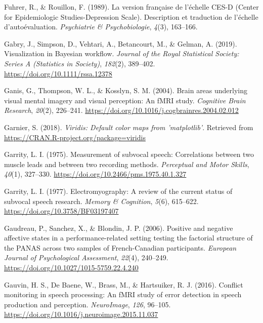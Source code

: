 \documentclass[a4paper,12pt,twoside,onecolumn,openright,final,oldfontcommands]{memoir}
\begin{document}
\leavevmode\hypertarget{ref-fuhrer_version_1989}{}%
Fuhrer, R., \& Rouillon, F. (1989). La version française de l'échelle CES-D (Center for Epidemiologic Studies-Depression Scale). Description et traduction de l'échelle d'autoévaluation. \emph{Psychiatrie \& Psychobiologie}, \emph{4}(3), 163--166.

\leavevmode\hypertarget{ref-gabry_visualization_2019}{}%
Gabry, J., Simpson, D., Vehtari, A., Betancourt, M., \& Gelman, A. (2019). Visualization in Bayesian workﬂow. \emph{Journal of the Royal Statistical Society: Series A (Statistics in Society)}, \emph{182}(2), 389--402. \url{https://doi.org/10.1111/rssa.12378}

\leavevmode\hypertarget{ref-ganis_brain_2004}{}%
Ganis, G., Thompson, W. L., \& Kosslyn, S. M. (2004). Brain areas underlying visual mental imagery and visual perception: An fMRI study. \emph{Cognitive Brain Research}, \emph{20}(2), 226--241. \url{https://doi.org/10.1016/j.cogbrainres.2004.02.012}

\leavevmode\hypertarget{ref-R-viridis}{}%
Garnier, S. (2018). \emph{Viridis: Default color maps from 'matplotlib'}. Retrieved from \url{https://CRAN.R-project.org/package=viridis}

\leavevmode\hypertarget{ref-garrity_measurement_1975}{}%
Garrity, L. I. (1975). Measurement of subvocal speech: Correlations between two muscle leads and between two recording methods. \emph{Perceptual and Motor Skills}, \emph{40}(1), 327--330. \url{https://doi.org/10.2466/pms.1975.40.1.327}

\leavevmode\hypertarget{ref-garrity_electromyography_1977}{}%
Garrity, L. I. (1977). Electromyography: A review of the current status of subvocal speech research. \emph{Memory \& Cognition}, \emph{5}(6), 615--622. \url{https://doi.org/10.3758/BF03197407}

\leavevmode\hypertarget{ref-Gaudreau2006}{}%
Gaudreau, P., Sanchez, X., \& Blondin, J. P. (2006). Positive and negative affective states in a performance-related setting testing the factorial structure of the PANAS across two samples of French-Canadian participants. \emph{European Journal of Psychological Assessment}, \emph{22}(4), 240--249. \url{https://doi.org/10.1027/1015-5759.22.4.240}

\leavevmode\hypertarget{ref-gauvin_conflict_2016}{}%
Gauvin, H. S., De Baene, W., Brass, M., \& Hartsuiker, R. J. (2016). Conflict monitoring in speech processing: An fMRI study of error detection in speech production and perception. \emph{NeuroImage}, \emph{126}, 96--105. \url{https://doi.org/10.1016/j.neuroimage.2015.11.037}
\end{document}
